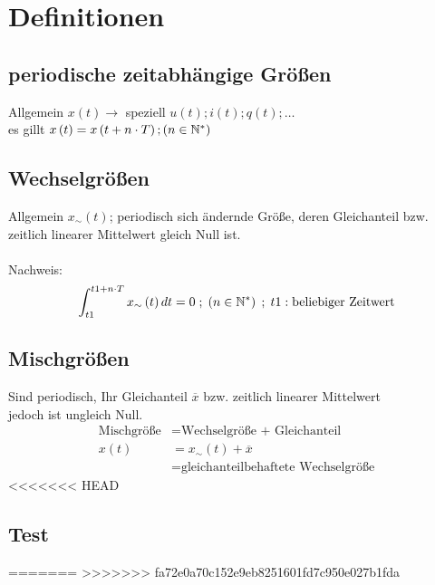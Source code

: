 \section{Definitionen}

\subsection{periodische zeitabhängige Größen}
Allgemein \(x\left(t\right) \xrightarrow{}\) speziell \(u\left(t\right); i\left(t\right); q\left(t\right); \dots\) \\
es gillt \(x\left(t\right) = x\left(t + n \cdot T\right) ; \left(n \in \mathbb{N}^* \right) \)

\subsection{Wechselgrößen}
Allgemein \(x_{\sim} \left(t\right)\); periodisch sich ändernde Größe, deren Gleichanteil bzw. 
zeitlich linearer Mittelwert gleich Null ist. \\ \vspace{0mm} \\
Nachweis: \[\int_{t1}^{t1 + n \cdot T} x_{\sim} \left(t\right)dt = 0 \; ; \; \left(n \in \mathbb{N}^* \right) \;
; \; t1: \text{beliebiger Zeitwert}\]

\subsection{Mischgrößen}
Sind periodisch, Ihr Gleichanteil \(\overline{x}\) bzw. zeitlich linearer Mittelwert \\
jedoch ist ungleich Null. 
\begin{align*}
\text{Mischgröße} &= \text{Wechselgröße + Gleichanteil} \\
x\left(t\right) &= x_{\sim}\left(t\right) + \overline{x} \\
&= \text{gleichanteilbehaftete Wechselgröße}
\end{align*}
<<<<<<< HEAD

\subsection{Test}
=======
>>>>>>> fa72e0a70c152e9eb8251601fd7c950e027b1fda
